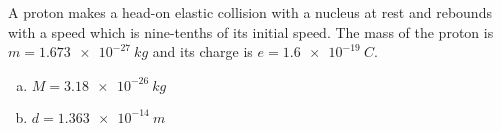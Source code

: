 \question A proton makes a head-on elastic collision with a nucleus at rest and rebounds with a speed which is nine-tenths of its initial speed. The mass of the proton is $m = \SI{1.673e-27}{kg}$ and its charge is $e=\SI{1.6e-19}{C}$.
\begin{finalanswer}
\begin{enumerate}[(a)]
\item $M=\SI{3.18e-26}{kg}$
\item $d=\SI{1.363e-14}{m}$
\end{enumerate}
\end{finalanswer}
